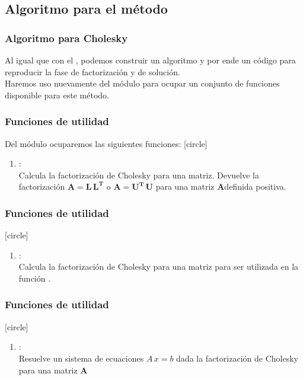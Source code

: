 \subsection{Algoritmo para el método}
\begin{frame}
\frametitle{Algoritmo para Cholesky}
Al igual que con el , podemos construir un algoritmo y por ende un código para reproducir la fase de factorización y de solución.
\\
\bigskip
Haremos uso nuevamente del módulo  para ocupar un conjunto de funciones disponible para este método.
\end{frame}
\begin{frame}
\frametitle{Funciones de utilidad}
Del módulo  ocuparemos las siguientes funciones:
[circle]
\begin{enumerate}[<+->]
\item {}: \\
Calcula la factorización de Cholesky para una matriz. Devuelve la factorización $\mathbf{A = L \, L^{T}}$ o $\mathbf{A = U^{T} \, U}$ para una matriz $\mathbf{A}$definida positiva.
\seti
\end{enumerate}
\end{frame}
\begin{frame}
\frametitle{Funciones de utilidad}
[circle]
\begin{enumerate}[<+->]
\conti
\item {}: \\
Calcula la factorización de Cholesky para una matriz para ser utilizada en la función .
\seti
\end{enumerate}
\end{frame}    
\begin{frame}
\frametitle{Funciones de utilidad}
[circle]
\begin{enumerate}[<+->]
\conti
\item {}: \\
Resuelve un sistema de ecuaciones $A \, x = b$ dada la factorización de Cholesky para una matriz $\mathbf{A}$
\end{enumerate}
\end{frame} 
